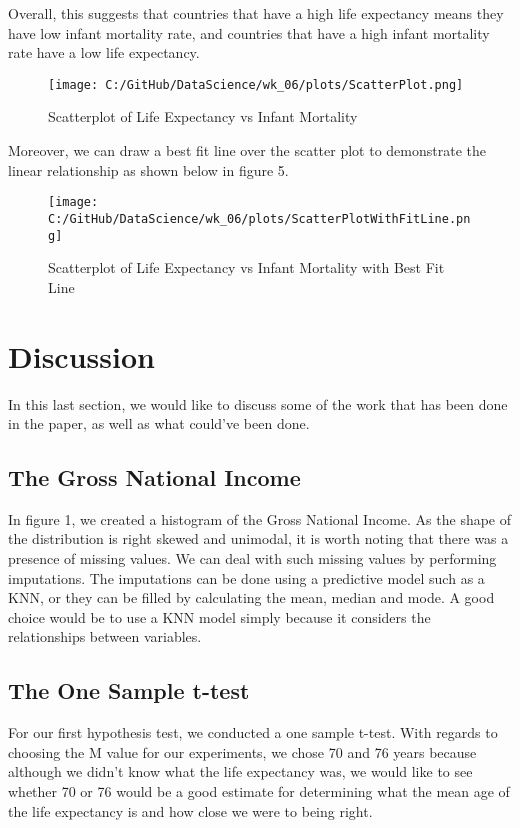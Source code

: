 \documentclass[a4paper, twocolumn]{article}
\begin{document}
Overall, this suggests that countries that have a high life expectancy means they have low infant mortality rate,
and countries that have a high infant mortality rate have a low life expectancy.

\begin{figure}[htbp] 
    \centering
    \texttt{[image: C:/GitHub/DataScience/wk\_06/plots/ScatterPlot.png]}
    \caption{Scatterplot of Life Expectancy vs Infant Mortality} 
\end{figure}

Moreover, we can draw a best fit line over the scatter plot to demonstrate the linear relationship as shown below in
figure 5.

\begin{figure}[htbp] 
    \centering
    \texttt{[image: C:/GitHub/DataScience/wk\_06/plots/ScatterPlotWithFitLine.png]}
    \caption{Scatterplot of Life Expectancy vs Infant Mortality with Best Fit Line} 
\end{figure}



\section{Discussion}
In this last section, we would like to discuss some of the work that has been done in the paper, as well as what
could've been done.

\subsection{The Gross National Income}
In figure 1, we created a histogram of the Gross National Income. As the shape of the distribution is right skewed 
and unimodal, it is worth noting that there was a presence of missing values. We can deal with such missing values
by performing imputations. The imputations can be done using a predictive model such as a KNN, or they can be filled
by calculating the mean, median and mode. A good choice would be to use a KNN model simply because it considers the 
relationships between variables.

\subsection{The One Sample t-test}
For our first hypothesis test, we conducted a one sample t-test. With regards to choosing the M value for our 
experiments, we chose 70 and 76 years because although we didn't know what the life expectancy was, we would like 
to see whether 70 or 76 would be a good estimate for determining what the mean age of the life expectancy is and how 
close we were to being right.
\end{document}
